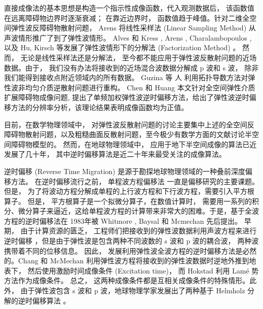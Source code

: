 直接成像法的基本思想是构造一个指示性成像函数，代入观测数据后， 该函数值在远离障碍物边界时逐渐衰减； 在靠近边界时， 函数值趋于峰值。针对二维全空间弹性波反障碍物散射问题， Arens \cite{arens2001linear} 将线性采样法 (Linear Sampling Method) 从声波情形推广了到了弹性波情形。  Alves 和 Kress \cite{alves2002far}, Arens \cite{arens2001linear}, Charalambopoulos \cite{charalambopoulos2006factorization}, 以及  Hu, Kirsch \cite{hu2012some} 等发展了弹性波情形下的分解法 (Factorization Method) 。 然而， 无论是线性采样法还是分解法， 至今都不能应用于弹性波反散射问题的近场数据。由于， 我们没有办法将接收到的近场混合波数据分解成 p 波和 s 波， 除非我们能得到接收点附近领域内的所有数据。 Guzina 等
人 \cite{gintides2012identification} 利用拓扑导数方法对弹性波非均匀介质逆散射问题进行重构。 Chen 和 Huang \cite{ela_reverse} 本文针对全空间弹性介质扩展障碍物成像问题, 提出了单频加权弹性波逆时偏移方法，给出了弹性波逆时偏移方法的分辨率分析，该理论结果表明成像函数均为正值。

目前，在数学物理领域中， 对弹性波反散射问题的讨论主要集中上述的全空间反障碍物散射问题，以及粗糙曲面反散射问题\cite{hu2016factorization,li2016near}，至今极少有数学方面的文献讨论半空间障碍物模型的。 然而，在地球物理领域中， 应用于地下半空间成像的算法已近发展了几十年， 其中逆时偏移算法是近二十年来最受关注的成像算法。

逆时偏移 (Reverse Time Migration) 是源于勘探地球物理领域的一种叠前深度偏移方法。 在逆时偏移流行之前， 单程波方程偏移法\cite{claerbout1972downward,gazdag1978wave} 一直是偏移研究的主要课题。但是， 为了将波动方程分解成单程的上行波方程和下行波方程，需要引入平方根算子\cite{zhanggq1993,Zhang2007}。 但是， 平方根算子是一个拟微分算子，在数值计算时， 需要用一系列的积分、微分算子来逼近，这给单程波方程的计算带来非常大的困难。于是，基于全波方程的逆时偏移法在 1983年被 Whitmore \cite{whitmore1983iterative}, Baysal \cite{baysal1983reverse} 和 Mcmechan  \cite{mcmechan1983migration} 先后提出。 早期， 由于计算资源的匮乏， 工程师们把接收到的弹性波数据利用声波方程来进行逆时偏移 \cite{zhang2009,Zhang08,bleistein2013mathematics,claerbout1985imaging,berkhout2012seismic}，但是由于弹性波是包含两种不同波数的 s 波和 p 波的耦合波， 两种波携带着不同的位移信息\cite{yan2008isotropic}。 因此， 发展利用弹性波全波方程的逆时偏移方法是必然的。Chang 和 McMechan \cite{chang1986reverse} 利用弹性波方程将接收到的弹性波数据时逆地外推到地表下， 然后使用激励时间成像条件 (Excitation time)， 而 Hokstad\cite{hokstad1998elastic} 利用 {Lam\'{e}} 势方法作为成像条件。 总之， 这两种成像条件都是互相关成像条件的特殊情形\cite{yan2008isotropic}。此外， 由于弹性波包含 s 波和 p 波，地球物理学家发展出了两种基于 Helmholz 分解的逆时偏移算法 \cite{yan2008isotropic,sun2001scalar,denli2008elastic,chung2012implementation}。 

